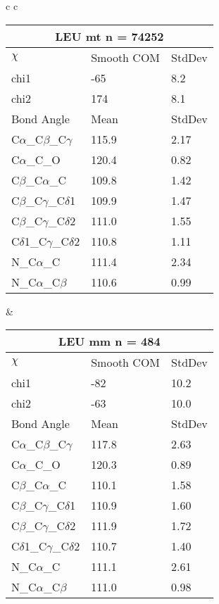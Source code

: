 \begin{longtable}{ c c }
\begin{tabular}{ l l l }
  \multicolumn{3}{c}{LEU \textbf{mt} n = 74252} \\ \toprule
  $\chi$       & Smooth COM & StdDev \\ \midrule
  chi1 & -65 & 8.2 \\ 
  chi2 & 174 & 8.1 \\ \midrule
  Bond Angle   & Mean     & StdDev \\ \midrule
  C$\alpha$\_C$\beta$\_C$\gamma$ & 115.9 & 2.17\\
  C$\alpha$\_C\_O & 120.4 & 0.82\\
  C$\beta$\_C$\alpha$\_C & 109.8 & 1.42\\
  C$\beta$\_C$\gamma$\_C$\delta$1 & 109.9 & 1.47\\
  C$\beta$\_C$\gamma$\_C$\delta$2 & 111.0 & 1.55\\
  C$\delta$1\_C$\gamma$\_C$\delta$2 & 110.8 & 1.11\\
  N\_C$\alpha$\_C & 111.4 & 2.34\\
  N\_C$\alpha$\_C$\beta$ & 110.6 & 0.99\\
  \bottomrule
  \end{tabular}
  &
  \begin{tabular}{ l l l }
  \toprule
  \multicolumn{3}{c}{LEU \textbf{mm} n = 484} \\ \toprule
  $\chi$       & Smooth COM & StdDev \\ \midrule
  chi1 & -82 & 10.2 \\ 
  chi2 & -63 & 10.0 \\ \midrule
  Bond Angle   & Mean     & StdDev \\ \midrule
  C$\alpha$\_C$\beta$\_C$\gamma$ & 117.8 & 2.63\\
  C$\alpha$\_C\_O & 120.3 & 0.89\\
  C$\beta$\_C$\alpha$\_C & 110.1 & 1.58\\
  C$\beta$\_C$\gamma$\_C$\delta$1 & 110.9 & 1.60\\
  C$\beta$\_C$\gamma$\_C$\delta$2 & 111.9 & 1.72\\
  C$\delta$1\_C$\gamma$\_C$\delta$2 & 110.7 & 1.40\\
  N\_C$\alpha$\_C & 111.1 & 2.61\\
  N\_C$\alpha$\_C$\beta$ & 111.0 & 0.98\\
  \bottomrule
  \end{tabular}
  \\
  
\end{longtable}

\newpage


